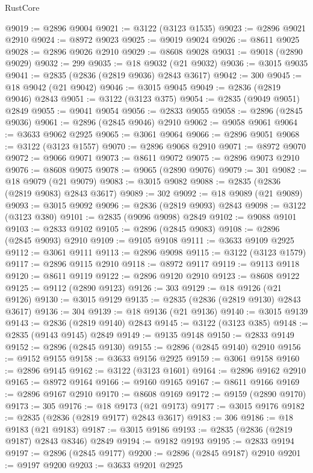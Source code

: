 \begin{lexlean}{RustCore}
\begin{coremodule}
@9019 := @2896 @9004
@9021 := @3122 (@3123 @1535)
@9023 := @2896 @9021 @2910
@9024 := @8972 @9023
@9025 := @9019 @9024
@9026 := @8611 @9025
@9028 := @2896 @9026 @2910
@9029 := @8608 @9028
@9031 := @9018 (@2890 @9029)
@9032 := 299
@9035 := @18 @9032 (@21 @9032)
@9036 := @3015 @9035
@9041 := @2835 (@2836 (@2819 @9036) @2843 @3617)
@9042 := 300
@9045 := @18 @9042 (@21 @9042)
@9046 := @3015 @9045
@9049 := @2836 (@2819 @9046) @2843
@9051 := @3122 (@3123 @375)
@9054 := @2835 (@9049 @9051) @2849
@9055 := @9041 @9054
@9056 := @2833 @9055
@9058 := @2896 (@2845 @9036)
@9061 := @2896 (@2845 @9046) @2910
@9062 := @9058 @9061
@9064 := @3633 @9062 @2925
@9065 := @3061 @9064
@9066 := @2896 @9051
@9068 := @3122 (@3123 @1557)
@9070 := @2896 @9068 @2910
@9071 := @8972 @9070
@9072 := @9066 @9071
@9073 := @8611 @9072
@9075 := @2896 @9073 @2910
@9076 := @8608 @9075
@9078 := @9065 (@2890 @9076)
@9079 := 301
@9082 := @18 @9079 (@21 @9079)
@9083 := @3015 @9082
@9088 := @2835 (@2836 (@2819 @9083) @2843 @3617)
@9089 := 302
@9092 := @18 @9089 (@21 @9089)
@9093 := @3015 @9092
@9096 := @2836 (@2819 @9093) @2843
@9098 := @3122 (@3123 @380)
@9101 := @2835 (@9096 @9098) @2849
@9102 := @9088 @9101
@9103 := @2833 @9102
@9105 := @2896 (@2845 @9083)
@9108 := @2896 (@2845 @9093) @2910
@9109 := @9105 @9108
@9111 := @3633 @9109 @2925
@9112 := @3061 @9111
@9113 := @2896 @9098
@9115 := @3122 (@3123 @1579)
@9117 := @2896 @9115 @2910
@9118 := @8972 @9117
@9119 := @9113 @9118
@9120 := @8611 @9119
@9122 := @2896 @9120 @2910
@9123 := @8608 @9122
@9125 := @9112 (@2890 @9123)
@9126 := 303
@9129 := @18 @9126 (@21 @9126)
@9130 := @3015 @9129
@9135 := @2835 (@2836 (@2819 @9130) @2843 @3617)
@9136 := 304
@9139 := @18 @9136 (@21 @9136)
@9140 := @3015 @9139
@9143 := @2836 (@2819 @9140) @2843
@9145 := @3122 (@3123 @385)
@9148 := @2835 (@9143 @9145) @2849
@9149 := @9135 @9148
@9150 := @2833 @9149
@9152 := @2896 (@2845 @9130)
@9155 := @2896 (@2845 @9140) @2910
@9156 := @9152 @9155
@9158 := @3633 @9156 @2925
@9159 := @3061 @9158
@9160 := @2896 @9145
@9162 := @3122 (@3123 @1601)
@9164 := @2896 @9162 @2910
@9165 := @8972 @9164
@9166 := @9160 @9165
@9167 := @8611 @9166
@9169 := @2896 @9167 @2910
@9170 := @8608 @9169
@9172 := @9159 (@2890 @9170)
@9173 := 305
@9176 := @18 @9173 (@21 @9173)
@9177 := @3015 @9176
@9182 := @2835 (@2836 (@2819 @9177) @2843 @3617)
@9183 := 306
@9186 := @18 @9183 (@21 @9183)
@9187 := @3015 @9186
@9193 := @2835 (@2836 (@2819 @9187) @2843 @8346) @2849
@9194 := @9182 @9193
@9195 := @2833 @9194
@9197 := @2896 (@2845 @9177)
@9200 := @2896 (@2845 @9187) @2910
@9201 := @9197 @9200
@9203 := @3633 @9201 @2925

\end{coremodule}
\end{lexlean}

